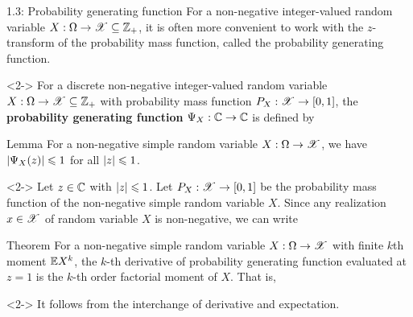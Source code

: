 \documentclass[12pt,aspectratio=169]{beamer}
\begin{document}
\begin{frame}{1.3: Probability generating function}
For a non-negative integer-valued random variable $X: \Omega \to \mathscr{X} \subseteq \mathbb{Z}_+$, 
it is often more convenient to work with the $z$-transform of the probability mass function, 
called the probability generating function. 
\begin{Definition}<2->
For a discrete non-negative integer-valued random variable $X: \Omega \to \mathscr{X} \subseteq \mathbb{Z}_+$ with probability mass function $P_X: \mathscr{X} \to [0,1]$, the \textbf{probability generating function} $\Psi_X: \mathbb{C} \to \mathbb{C}$ is defined by
\end{Definition} 
\end{frame}
\begin{frame}
\begin{block}{Lemma}
For a non-negative simple random variable $X: \Omega \to \mathscr{X}$, we have $\left\lvert\Psi_X(z)\right\rvert \leqslant 1$ for all $\left\lvert z\right\rvert \leqslant 1$. 
\end{block}
\begin{Proof}<2->
Let $z \in \mathbb{C}$ with $\left\lvert z\right\rvert\leqslant 1$. 
Let $P_X : \mathscr{X} \to [0,1]$ be the probability mass function of the non-negative simple random variable $X$. 
Since any realization $x \in \mathscr{X}$ of random variable $X$ is non-negative, we can write 
\end{Proof}
\end{frame}
\begin{frame}



\begin{block}{Theorem} 
For a non-negative simple random variable $X:\Omega \to \mathscr{X}$ with finite $k$th moment $\mathbb{E} X^k$, 
the $k$-th derivative of probability generating function evaluated at $z=1$ is the $k$-th order factorial moment of $X$. 
That is, 
\end{block}
\begin{Proof}<2->
It follows from the interchange of derivative and expectation. 
\end{Proof}
\end{frame}
\end{document}
